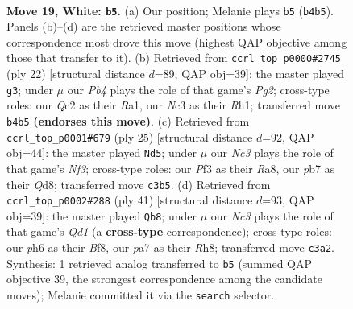 \documentclass[11pt]{article}
\begin{document}
\clearpage

\begin{figure}[p]\centering
\begin{subfigure}{0.46\textwidth}\centering
\resizebox{\linewidth}{!}{%
\newchessgame
\chessboard[
  setfen={rnbq4/pp4kp/2p1r2p/3p4/PP1P2Pb/2N1PP2/2QKN3/R4B1R w - - 1 19},
  showmover=false,
  pgfstyle=straightmove, color=movearrow, markmove={b4-b5}
]}
\caption{}
\end{subfigure}\hfill
\begin{subfigure}{0.46\textwidth}\centering
\resizebox{\linewidth}{!}{%
\newchessgame
\chessboard[
  setfen={rnb1k2r/1p2bp1p/p3p3/2q2p2/8/2P2N2/PP1NQPPP/R3KB1R w KQkq - 0 12},
  showmover=false,
  pgfstyle=straightmove, color=movearrow, markmove={g2-g3}
]}
\caption{}
\end{subfigure}
\\[4pt]
\begin{subfigure}{0.46\textwidth}\centering
\resizebox{\linewidth}{!}{%
\newchessgame
\chessboard[
  setfen={r2qk2r/pp1n1pp1/4pnp1/2b5/Q5P1/4P2P/PP3PB1/RNB1K2R b KQkq - 2 13},
  showmover=false,
  pgfstyle=straightmove, color=movearrow, markmove={f6-d5}
]}
\caption{}
\end{subfigure}\hfill
\begin{subfigure}{0.46\textwidth}\centering
\resizebox{\linewidth}{!}{%
\newchessgame
\chessboard[
  setfen={3qkb1r/Nbrn1pp1/3pp3/4n1P1/P3P2p/1P2BP1R/2PQ3P/1K1R1B2 b k - 0 21},
  showmover=false,
  pgfstyle=straightmove, color=movearrow, markmove={d8-b8}
]}
\caption{}
\end{subfigure}
\caption{\textbf{Move 19, White: \texttt{b5}.} (a) Our position; Melanie plays \texttt{b5} (\texttt{b4b5}). Panels (b)--(d) are the retrieved master positions whose correspondence most drove this move (highest QAP objective among those that transfer to it). (b) Retrieved from \texttt{ccrl\_top\_p0000\#2745} (ply 22) [structural distance $d$=89, QAP obj=39]: the master played \texttt{g3}; under $\mu$ our \emph{Pb4} plays the role of that game's \emph{Pg2}; cross-type roles: our \emph{Q}c2 as their \emph{R}a1, our \emph{N}c3 as their \emph{R}h1; transferred move \texttt{b4b5} \textbf{(endorses this move)}. (c) Retrieved from \texttt{ccrl\_top\_p0001\#679} (ply 25) [structural distance $d$=92, QAP obj=44]: the master played \texttt{Nd5}; under $\mu$ our \emph{Nc3} plays the role of that game's \emph{Nf3}; cross-type roles: our \emph{P}f3 as their \emph{R}a8, our \emph{p}b7 as their \emph{Q}d8; transferred move \texttt{c3b5}. (d) Retrieved from \texttt{ccrl\_top\_p0002\#288} (ply 41) [structural distance $d$=93, QAP obj=39]: the master played \texttt{Qb8}; under $\mu$ our \emph{Nc3} plays the role of that game's \emph{Qd1} (a \textbf{cross-type} correspondence); cross-type roles: our \emph{p}h6 as their \emph{B}f8, our \emph{p}a7 as their \emph{R}h8; transferred move \texttt{c3a2}. Synthesis: 1 retrieved analog transferred to \texttt{b5} (summed QAP objective 39, the strongest correspondence among the candidate moves); Melanie committed it via the \texttt{search} selector.}
\label{fig:thought-m36}
\end{figure}
\end{document}
